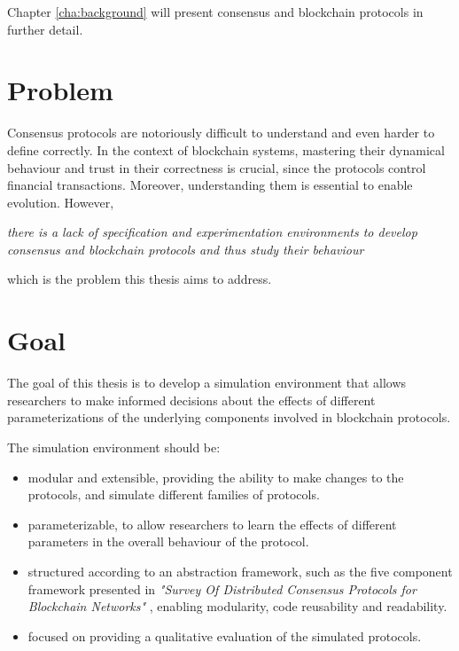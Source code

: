Chapter \ref{cha:background} will present consensus and blockchain protocols in further detail.


\section{Problem}

Consensus protocols are notoriously difficult to understand and even harder to define correctly. In the context of blockchain systems, mastering their dynamical behaviour and trust in their correctness is crucial, since the protocols control financial transactions. Moreover, understanding them is essential to enable evolution. However,

\begin{center}
  \emph{there is a lack of specification and experimentation environments to develop consensus and blockchain protocols and thus study their behaviour}
\end{center}

\noindent which is the problem this thesis aims to address.



\section{Goal}

The goal of this thesis is to develop a simulation environment that allows researchers to make informed decisions about the effects of different parameterizations of the underlying components involved in blockchain protocols.

The simulation environment should be:

\begin{itemize}
  \item modular and extensible, providing the ability to make changes to the protocols, and simulate different families of protocols.
  \item parameterizable, to allow researchers to learn the effects of different parameters in the overall behaviour of the protocol.
  \item structured according to an abstraction framework, such as the five component framework presented in \textit{"Survey Of Distributed Consensus Protocols for Blockchain Networks"} \cite{survey_bchain_networks}, enabling modularity, code reusability and readability.
  \item focused on providing a qualitative evaluation of the simulated protocols.
\end{itemize}

